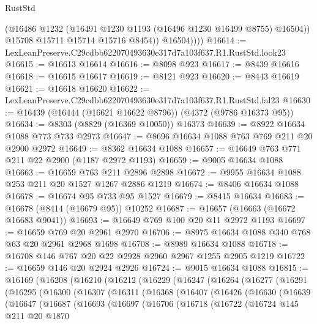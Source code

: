 \begin{lexlean}{RustStd}
\begin{coremodule}
                (@16486 @1232 (@16491 @1230 @1193 (@16496 @1230 @16499 @8755) @16504))
                @15708
                @15711
                @15714
                @15716
                @8454))
            @16504))))
@16614 := LexLeanPreserve.C29cdbb622070493630e317d7a103f637.R1.RustStd.look23
@16615 := @16613 @16614
@16616 := @8098 @923
@16617 := @8439 @16616
@16618 := @16615 @16617
@16619 := @8121 @923
@16620 := @8443 @16619
@16621 := @16618 @16620
@16622 := LexLeanPreserve.C29cdbb622070493630e317d7a103f637.R1.RustStd.fal23
@16630 := @16439 (@16444 (@16621 @16622 @8796)) (@4372 (@9786 @16373 @95))
@16634 := @8303 (@8829 (@16369 @10050)) @16373
@16639 := @8922 @16634 @1088 @773 @733 @2973
@16647 := @8696 @16634 @1088 @763 @769 @211 @20 @2900 @2972
@16649 := @8362 @16634 @1088
@16657 := @16649 @763 @771 @211 @22 @2900 (@1187 @2972 @1193)
@16659 := @9005 @16634 @1088
@16663 := @16659 @763 @211 @2896 @2898
@16672 := @9955 @16634 @1088 @253 @211 @20 @1527 @1267 @2886 @1219
@16674 := @8406 @16634 @1088
@16678 := @16674 @95 @733 @95 @1527
@16679 := @8415 @16634
@16683 := @16678 (@8414 (@16679 @95)) @10252
@16687 := @16657 (@16663 (@16672 @16683 @9041))
@16693 := @16649 @769 @100 @20 @11 @2972 @1193
@16697 := @16659 @769 @20 @2961 @2970
@16706 := @8975 @16634 @1088 @340 @768 @63 @20 @2961 @2968 @1698
@16708 := @8989 @16634 @1088
@16718 := @16708 @146 @767 @20 @22 @2928 @2960 @2967 @1255 @2905 @1219
@16722 := @16659 @146 @20 @2924 @2926
@16724 := @9015 @16634 @1088
@16815 := @16169
    (@16208
      (@16210
        (@16212
          (@16229
            (@16247
              (@16264
                (@16277
                  (@16291
                    (@16295
                      (@16300
                        (@16307
                          (@16311
                            (@16368
                              (@16407
                                (@16426
                                  (@16630
                                    (@16639
                                      (@16647
                                        (@16687
                                          (@16693
                                            (@16697
                                              (@16706
                                                (@16718
                                                  (@16722
                                                    (@16724
                                                      @145
                                                      @211
                                                      @20
                                                      @1870

\end{coremodule}
\end{lexlean}
